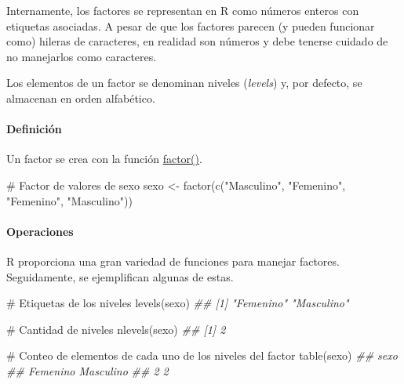 \documentclass[
  letterpaper,
  DIV=11,
  numbers=noendperiod]{scrreprt}
\let\oldparagraph\paragraph
\renewcommand{\paragraph}[1]{\oldparagraph{#1}\mbox{}}
\newenvironment{Shaded}{\begin{snugshade}}{\end{snugshade}}
\newcommand{\CommentTok}[1]{\textcolor[rgb]{0.37,0.37,0.37}{#1}}
\newcommand{\DocumentationTok}[1]{\textcolor[rgb]{0.37,0.37,0.37}{\textit{#1}}}
\newcommand{\FunctionTok}[1]{\textcolor[rgb]{0.28,0.35,0.67}{#1}}
\newcommand{\NormalTok}[1]{\textcolor[rgb]{0.00,0.23,0.31}{#1}}
\newcommand{\OtherTok}[1]{\textcolor[rgb]{0.00,0.23,0.31}{#1}}
\newcommand{\StringTok}[1]{\textcolor[rgb]{0.13,0.47,0.30}{#1}}
\begin{document}
Internamente, los factores se representan en R como números enteros con
etiquetas asociadas. A pesar de que los factores parecen (y pueden
funcionar como) hileras de caracteres, en realidad son números y debe
tenerse cuidado de no manejarlos como caracteres.

Los elementos de un factor se denominan niveles (\emph{levels}) y, por
defecto, se almacenan en orden alfabético.

\hypertarget{definiciuxf3n-2}{%
\paragraph{Definición}\label{definiciuxf3n-2}}

Un factor se crea con la función
\href{https://rdrr.io/r/base/factor.html}{factor()}.

\begin{Shaded}
\begin{Highlighting}[]
\CommentTok{\# Factor de valores de sexo}
\NormalTok{sexo }\OtherTok{\textless{}{-}} \FunctionTok{factor}\NormalTok{(}\FunctionTok{c}\NormalTok{(}\StringTok{"Masculino"}\NormalTok{, }\StringTok{"Femenino"}\NormalTok{, }\StringTok{"Femenino"}\NormalTok{, }\StringTok{"Masculino"}\NormalTok{))}
\end{Highlighting}
\end{Shaded}

\hypertarget{operaciones-2}{%
\paragraph{Operaciones}\label{operaciones-2}}

R proporciona una gran variedad de funciones para manejar factores.
Seguidamente, se ejemplifican algunas de estas.

\begin{Shaded}
\begin{Highlighting}[]
\CommentTok{\# Etiquetas de los niveles}
\FunctionTok{levels}\NormalTok{(sexo)}
\DocumentationTok{\#\# [1] "Femenino"  "Masculino"}

\CommentTok{\# Cantidad de niveles}
\FunctionTok{nlevels}\NormalTok{(sexo)}
\DocumentationTok{\#\# [1] 2}

\CommentTok{\# Conteo de elementos de cada uno de los niveles del factor}
\FunctionTok{table}\NormalTok{(sexo)}
\DocumentationTok{\#\# sexo}
\DocumentationTok{\#\#  Femenino Masculino }
\DocumentationTok{\#\#         2         2}
\end{Highlighting}
\end{Shaded}
\end{document}
